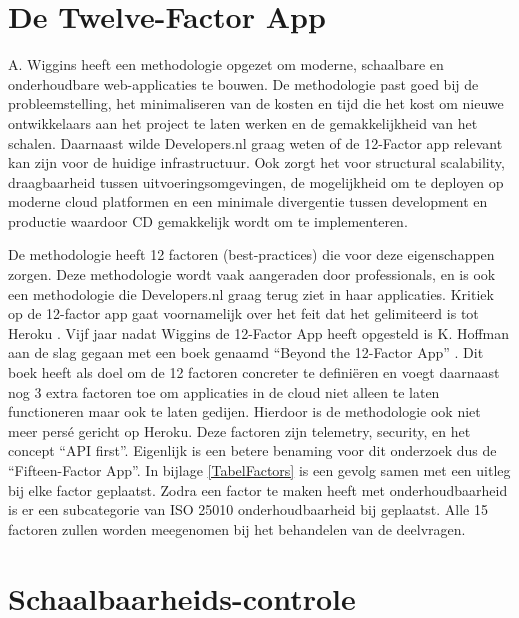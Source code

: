 \section{De Twelve-Factor App}

A. Wiggins \parencite{12Factor} heeft een methodologie opgezet om moderne, schaalbare en onderhoudbare web-applicaties te bouwen. De methodologie past goed bij de probleemstelling, het minimaliseren van de kosten en tijd die het kost om nieuwe ontwikkelaars aan het project te laten werken en de gemakkelijkheid van het schalen. Daarnaast wilde Developers.nl graag weten of de 12-Factor app relevant kan zijn voor de huidige infrastructuur. Ook zorgt het voor structural scalability, draagbaarheid tussen uitvoeringsomgevingen, de mogelijkheid om te deployen op moderne cloud platformen en een minimale divergentie tussen development en productie waardoor CD gemakkelijk wordt om te implementeren.

De methodologie heeft 12 factoren (best-practices) die voor deze eigenschappen zorgen. Deze methodologie wordt vaak aangeraden door professionals, en is ook een methodologie die Developers.nl graag terug ziet in haar applicaties. Kritiek op de 12-factor app gaat voornamelijk over het feit dat het gelimiteerd is tot Heroku \parencite{AdaptingTwelveFactor}. Vijf jaar nadat Wiggins de 12-Factor App heeft opgesteld is K. Hoffman aan de slag gegaan met een boek genaamd \enquote{Beyond the 12-Factor App} \parencite{Beyond12Factor}. Dit boek heeft als doel om de 12 factoren concreter te definiëren en voegt daarnaast nog 3 extra factoren toe om applicaties in de cloud niet alleen te laten functioneren maar ook te laten gedijen. Hierdoor is de methodologie ook niet meer persé gericht op Heroku. Deze factoren zijn telemetry, security, en het concept \enquote{API first}. Eigenlijk is een betere benaming voor dit onderzoek dus de \enquote{Fifteen-Factor App}. In bijlage \ref{TabelFactors} is een gevolg samen met een uitleg bij elke factor geplaatst. Zodra een factor te maken heeft met onderhoudbaarheid is er een subcategorie van ISO 25010 onderhoudbaarheid bij geplaatst. Alle 15 factoren zullen worden meegenomen bij het behandelen van de deelvragen.

\section{Schaalbaarheids-controle}

